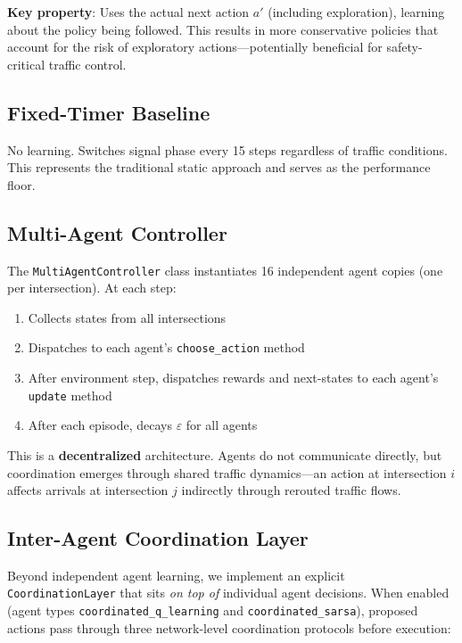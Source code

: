 \documentclass[12pt, a4paper]{article}
\begin{document}
\textbf{Key property}: Uses the actual next action $a'$ (including exploration), learning about the policy being followed. This results in more conservative policies that account for the risk of exploratory actions---potentially beneficial for safety-critical traffic control.

\subsection{Fixed-Timer Baseline}

No learning. Switches signal phase every 15 steps regardless of traffic conditions. This represents the traditional static approach and serves as the performance floor.

\subsection{Multi-Agent Controller}

The \texttt{MultiAgentController} class instantiates 16 independent agent copies (one per intersection). At each step:
\begin{enumerate}[nosep]
    \item Collects states from all intersections
    \item Dispatches to each agent's \texttt{choose\_action} method
    \item After environment step, dispatches rewards and next-states to each agent's \texttt{update} method
    \item After each episode, decays $\varepsilon$ for all agents
\end{enumerate}

This is a \textbf{decentralized} architecture. Agents do not communicate directly, but coordination emerges through shared traffic dynamics---an action at intersection $i$ affects arrivals at intersection $j$ indirectly through rerouted traffic flows.

\subsection{Inter-Agent Coordination Layer}

Beyond independent agent learning, we implement an explicit \texttt{CoordinationLayer} that sits \emph{on top of} individual agent decisions. When enabled (agent types \texttt{coordinated\_q\_learning} and \texttt{coordinated\_sarsa}), proposed actions pass through three network-level coordination protocols before execution:
\end{document}
